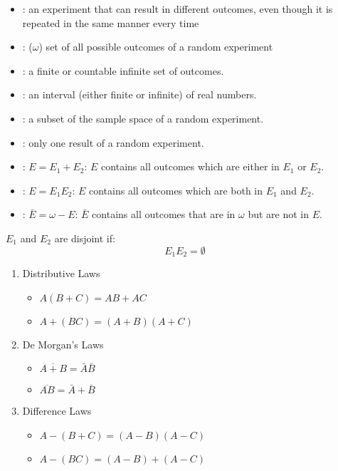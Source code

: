 \begin{multicols*}{3}

  \begin{itemize}[noitemsep,nolistsep]
    \item {}: an experiment that can result in different outcomes,
        even though it is repeated in the same manner every time
      \item {}: ($\omega$) set of all possible outcomes of a random
        experiment
      \item {}: a finite or countable infinite set of outcomes.
      \item {}: an interval (either finite or infinite) of real numbers.
      \item {}: a subset of the sample space of a random experiment.
      \item {}: only one result of a random experiment.
  \end{itemize}

    \begin{itemize}[noitemsep,nolistsep]
      \item {}: $E = E_1 + E_2$: $E$ contains all outcomes which are either in $E_1$ or $E_2$.
      \item {}: $E = E_1 E_2$: $E$ contains all outcomes which are both in $E_1$ and $E_2$.
      \item {}: $\bar{E} = \omega - E$: $\bar{E}$ contains all outcomes that are in $\omega$ but are not in $E$.
    \end{itemize}

    \par $E_1$ and $E_2$ are disjoint if:
    \[
      E_1 E_2 = \emptyset
    \]

      \begin{enumerate}[1.,noitemsep,nolistsep]
        \item Distributive Laws
          \begin{itemize}
            \item $A(B + C) = AB + AC$
            \item $A + (BC) = (A + B)(A + C)$
          \end{itemize}
        \item De Morgan's Laws
          \begin{itemize}
            \item $\overline{A + B} = \bar{A} \bar{B}$
            \item $\overline{AB} = \bar{A} + \bar{B}$
          \end{itemize}
        \item Difference Laws
          \begin{itemize}
            \item $A - (B + C) = (A - B)(A - C)$
            \item $A - (BC) = (A - B) + (A - C)$
          \end{itemize}
      \end{enumerate}


\end{multicols*}

